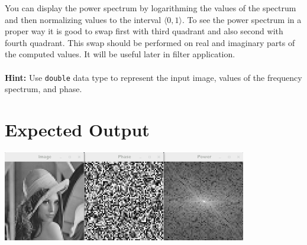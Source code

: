 \documentclass[12pt]{article}
\begin{document}
\noindent
You can display the power spectrum by logarithming the values of the spectrum and then normalizing values to the interval $\langle 0, 1\rangle$.
To see the power spectrum in a proper way it is good to swap first with third quadrant and also second with fourth quadrant.
This swap should be performed on real and imaginary parts of the computed values.
It will be useful later in filter application.
%
%
\\
\\
\noindent
\textbf{Hint:} Use \texttt{double} data type to represent the input image, values of the frequency spectrum, and phase.

\section*{Expected Output}

\begin{center}
\includegraphics[width=0.8\textwidth]{result_images.png}
\end{center}
\end{document}
